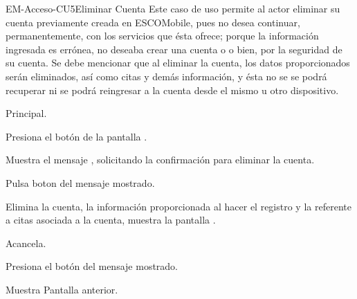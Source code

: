 	\begin{UseCase}{EM-Acceso-CU5}{Eliminar Cuenta}{
		\noindent
		Este caso de uso permite al actor eliminar su cuenta previamente creada en ESCOMobile, pues no desea
		continuar, permanentemente, con los servicios que ésta ofrece; porque la información ingresada es errónea,
		no deseaba crear una cuenta o o bien, por la seguridad de su cuenta. Se debe mencionar que al eliminar
		la cuenta, los datos proporcionados serán eliminados, así como citas y demás información, y ésta no se
		se podrá recuperar ni se podrá reingresar a la cuenta desde el mismo u otro dispositivo.
		\newline
		}
	\end{UseCase}
	
	\begin{UCtrayectoria}{Principal.}

		\UCpaso[\UCactor] Presiona el botón  de la pantalla .

		\UCpaso Muestra el mensaje , solicitando la confirmación para eliminar la cuenta.

		\UCpaso [\UCactor] Pulsa boton  del mensaje mostrado. 

		\UCpaso Elimina la cuenta, la información proporcionada al hacer el registro y la referente a citas asociada a la cuenta, muestra la pantalla .

	\end{UCtrayectoria}

\begin{UCtrayectoriaA}{A}{cancela.}

		\UCpaso	Presiona el botón  del mensaje mostrado.

		\UCpaso Muestra Pantalla anterior.

\end{UCtrayectoriaA}


